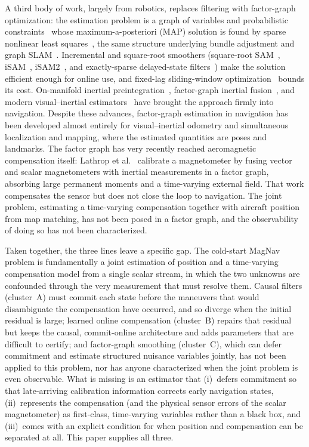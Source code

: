 \documentclass{IEEEtaes}
\begin{document}
A third body of work, largely from robotics, replaces filtering with factor-graph
optimization: the estimation problem is a graph of variables and probabilistic
constraints~\cite{kschischang2001} whose maximum-a-posteriori (MAP) solution is
found by sparse nonlinear least squares~\cite{dellaert2017,dellaert2012}, the same
structure underlying bundle adjustment and graph SLAM~\cite{triggs2000,grisetti2010,kummerle2011}.
Incremental and square-root smoothers (square-root
SAM~\cite{dellaert2006}, iSAM~\cite{kaess2008}, iSAM2~\cite{kaess2012}, and
exactly-sparse delayed-state filters~\cite{eustice2006}) make the solution
efficient enough for online use, and fixed-lag sliding-window
optimization~\cite{sibley2010,leutenegger2015} bounds its cost. On-manifold inertial
preintegration~\cite{forster2017}, factor-graph inertial
fusion~\cite{indelman2013}, and modern visual--inertial estimators~\cite{qin2018}
have brought the approach firmly into navigation. Despite these advances,
factor-graph estimation in navigation has been developed almost entirely for
visual--inertial odometry and simultaneous localization and mapping, where the
estimated quantities are poses and landmarks. The factor graph has very recently
reached aeromagnetic compensation itself: Lathrop et al.~\cite{lathrop2024}
calibrate a magnetometer by fusing vector and scalar magnetometers with inertial
measurements in a factor graph, absorbing large permanent moments and a
time-varying external field. That work compensates the sensor but does not close
the loop to navigation. The joint problem, estimating a time-varying compensation
together with aircraft position from map matching, has not been posed in a factor
graph, and the observability of doing so has not been characterized.

Taken together, the three lines leave a specific gap. The cold-start MagNav problem
is fundamentally a joint estimation of position and a time-varying
compensation model from a single scalar stream, in which the two unknowns are
confounded through the very measurement that must resolve them. Causal filters
(cluster~A) must commit each state before the maneuvers that would disambiguate the
compensation have occurred, and so diverge when the initial residual is large;
learned online compensation (cluster~B) repairs that residual but keeps the causal,
commit-online architecture and adds parameters that are difficult to certify; and
factor-graph smoothing (cluster~C), which can defer commitment and estimate
structured nuisance variables jointly, has not been applied to this problem, nor has
anyone characterized when the joint problem is even observable. What is missing is
an estimator that (i)~defers commitment so that late-arriving calibration
information corrects early navigation states, (ii)~represents the compensation (and
the physical sensor errors of the scalar magnetometer) as first-class,
time-varying variables rather than a black box, and (iii)~comes with an explicit
condition for when position and compensation can be separated at all. This paper
supplies all three.
\end{document}
